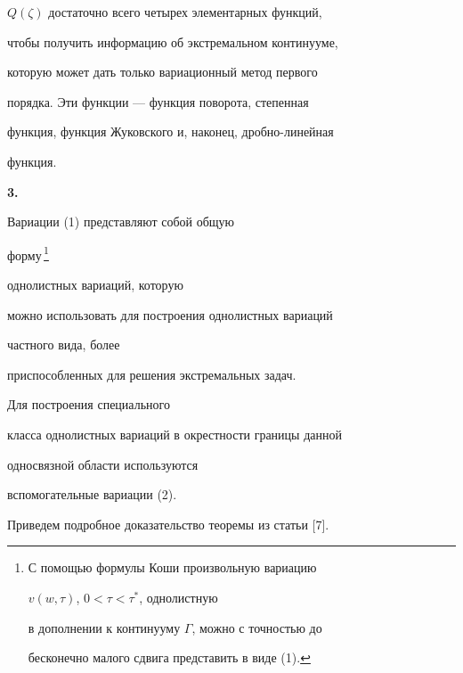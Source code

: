 $Q(\zeta)$ достаточно всего четырех элементарных функций,


чтобы получить информацию об экстремальном континууме,


которую может дать только вариационный метод первого


порядка. Эти функции --- функция поворота, степенная 


функция, функция Жуковского и, наконец, дробно-линейная 


функция.  


\medskip





{\bf 3.}


Вариации (1) представляют собой общую


форму\,\footnote{


С помощью формулы Коши произвольную вариацию 


$v(w,\tau)$, $0<\tau<\tau^{*}$, однолистную 


в дополнении к континууму $\Gamma$, можно с точностью до  


бесконечно малого сдвига представить в виде (1).}


однолистных вариаций, которую


можно использовать для построения однолистных вариаций


частного вида, более 


приспособленных для решения экстремальных задач. 


Для построения специального 


класса однолистных вариаций в окрестности границы данной


односвязной области используются


вспомогательные вариации (2). 





Приведем подробное доказательство теоремы из статьи [7].


\setcounter{footnote}{0}





